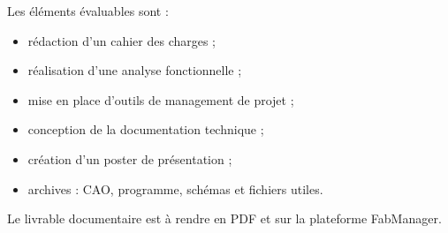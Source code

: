 Les éléments évaluables sont :

\begin{itemize}
    \item rédaction d'un cahier des charges ;
    \item réalisation d'une analyse fonctionnelle ;
    \item mise en place d'outils de management de projet ;
    \item conception de la documentation technique ;
    \item création d'un poster de présentation ;
    \item archives : CAO, programme, schémas et fichiers utiles.
\end{itemize}

Le livrable documentaire est à rendre en PDF et sur la plateforme FabManager.
